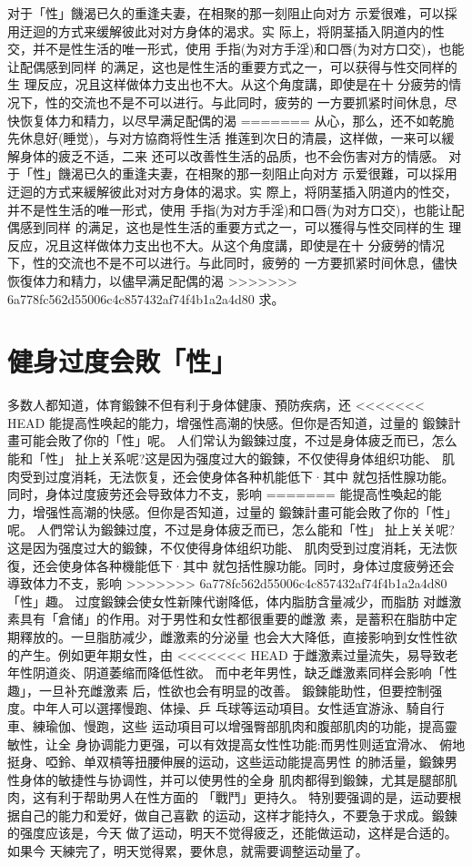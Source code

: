 \documentclass[12pt,UTF8]{ctexbook}
\begin{document}
对于「性」饑渴已久的重逢夫妻，在相聚的那一刻阻止向对方
示爱很难，可以採用迂迴的方式来缓解彼此对对方身体的渴求。实
际上，将阴茎插入阴道内的性交，并不是性生活的唯一形式，使用
手指(为对方手淫)和口唇(为对方口交)，也能让配偶感到同样
的满足，这也是性生活的重要方式之一，可以获得与性交同样的生
理反应，况且这样做体力支出也不大。从这个角度講，即使是在十
分疲劳的情况下，性的交流也不是不可以进行。与此同时，疲劳的
一方要抓紧时间休息，尽快恢复体力和精力，以尽早满足配偶的渴
=======
从心，那么，还不如乾脆先休息好(睡觉)，与对方協商将性生活
推莲到次日的清晨，这样做，一来可以緩解身体的疲乏不适，二来
还可以改善性生活的品质，也不会伤害对方的情感。
对于「性」饑渴已久的重逢夫妻，在相聚的那一刻阻止向对方
示爱很難，可以採用迂迴的方式来緩解彼此对对方身体的渴求。实
際上，将阴茎插入阴道内的性交，并不是性生活的唯一形式，使用
手指(为对方手淫)和口唇(为对方口交)，也能让配偶感到同样
的满足，这也是性生活的重要方式之一，可以獲得与性交同样的生
理反应，况且这样做体力支出也不大。从这个角度講，即使是在十
分疲勞的情况下，性的交流也不是不可以进行。与此同时，疲勞的
一方要抓紧时间休息，儘快恢復体力和精力，以儘早满足配偶的渴
>>>>>>> 6a778fc562d55006c4c857432af74f4b1a2a4d80
求。

\section{健身过度会敗「性」}

多数人都知道，体育鍛鍊不但有利于身体健康、預防疾病，还
<<<<<<< HEAD
能提高性唤起的能力，增强性高潮的快感。但你是否知道，过量的
鍛鍊計畫可能会敗了你的「性」呢。
人们常认为鍛鍊过度，不过是身体疲乏而已，怎么能和「性」
扯上关系呢?这是因为强度过大的鍛鍊，不仅使得身体组织功能、
肌肉受到过度消耗，无法恢复，还会使身体各种机能低下·其中
就包括性腺功能。同时，身体过度疲劳还会导致体力不支，影响
=======
能提高性喚起的能力，增强性高潮的快感。但你是否知道，过量的
鍛鍊計畫可能会敗了你的「性」呢。
人們常认为鍛鍊过度，不过是身体疲乏而已，怎么能和「性」
扯上关关呢?这是因为强度过大的鍛鍊，不仅使得身体组织功能、
肌肉受到过度消耗，无法恢復，还会使身体各种機能低下·其中
就包括性腺功能。同时，身体过度疲勞还会導致体力不支，影响
>>>>>>> 6a778fc562d55006c4c857432af74f4b1a2a4d80
「性」趣。
过度鍛鍊会使女性新陳代谢降低，体内脂肪含量减少，而脂肪
对雌激素具有「倉储」的作用。对于男性和女性都很重要的雌激
素，是蓄积在脂肪中定期釋放的。一旦脂肪减少，雌激素的分泌量
也会大大降低，直接影响到女性性欲的产生。例如更年期女性，由
<<<<<<< HEAD
于雌激素过量流失，易导致老年性阴道炎、阴道萎缩而降低性欲。
而中老年男性，缺乏雌激素同样会影响「性趣」，一旦补充雌激素
后，性欲也会有明显的改善。
鍛鍊能助性，但要控制强度。中年人可以選擇慢跑、体操、乒
乓球等运动項目。女性适宜游泳、騎自行車、練瑜伽、慢跑，这些
运动項目可以增强臀部肌肉和腹部肌肉的功能，提高靈敏性，让全
身协调能力更强，可以有效提高女性性功能:而男性则适宜滑冰、
俯地挺身、啞鈴、单双槓等扭腰伸展的运动，这些运动能提高男性
的肺活量，鍛鍊男性身体的敏捷性与协调性，并可以使男性的全身
肌肉都得到鍛鍊，尤其是腿部肌肉，这有利于帮助男人在性方面的
「戰鬥」更持久。
特別要强调的是，运动要根据自己的能力和爱好，做自己喜歡
的运动，这样才能持久，不要急于求成。鍛鍊的强度应该是，今天
做了运动，明天不觉得疲乏，还能做运动，这样是合适的。如果今
天練完了，明天觉得累，要休息，就需要调整运动量了。
\end{document}

